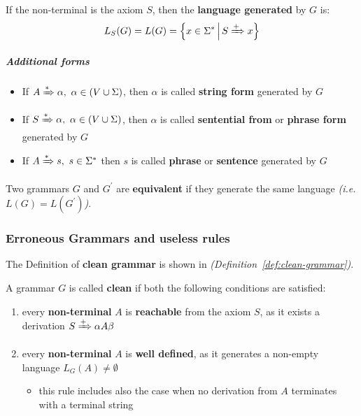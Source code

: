 \documentclass[english]{article}
\begin{document}
If the non-terminal is the axiom \(S\), then the \textbf{language generated} by \(G\) is:
\[ L_S(G) = L(G) = \left\{x \in \Sigma^\ast \, \middle| \, S \xRightarrow{+} x \right\} \]

\subparagraph*{Additional forms}

\begin{itemize}
  \item If \(A \xRightarrow{\ast} \alpha, \ \alpha \in (V \cup \Sigma)\), then \(\alpha\) is called \textbf{string form} generated by \(G\)
  \item If \(S \xRightarrow{\ast} \alpha, \ \alpha \in (V \cup \Sigma)\), then \(\alpha\) is called \textbf{sentential from} or \textbf{phrase form} generated by \(G\)
  \item If \(A \xRightarrow{\ast} s, \ s \in \Sigma^\ast\) then \(s\) is called \textbf{phrase} or \textbf{sentence} generated by \(G\)
\end{itemize}

\begin{property}
  Two grammars \(G\) and \(G^\prime\) are \textbf{equivalent} if they generate the same language \textit{(i.e. \(L(G) = L(G^\prime)\))}.
\end{property}

\subsubsection{Erroneous Grammars and useless rules}

The Definition of \textbf{clean grammar} is shown in \textit{(Definition~\ref{def:clean-grammar})}.

\begin{definition}
  \label{def:clean-grammar}
  A grammar \(G\) is called \textbf{clean} if both the following conditions are satisfied:

  \begin{enumerate}
    \item every \textbf{non-terminal} \(A\) is \textbf{reachable} from the axiom \(S\), as it exists a derivation \(S \xRightarrow{+} \alpha A \beta\)
    \item every \textbf{non-terminal} \(A\) is \textbf{well defined}, as it generates a non-empty language \(L_G(A) \neq \emptyset\)
          \begin{itemize}[label=\(\rightarrow\)]
            \item this rule includes also the case when no derivation from \(A\) terminates with a terminal string
          \end{itemize}
  \end{enumerate}
\end{definition}
\end{document}
